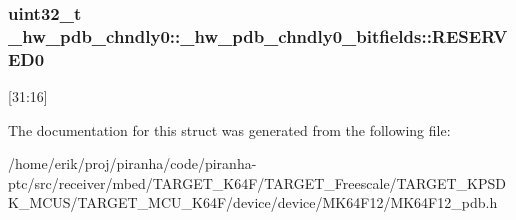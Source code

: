 \subsubsection[{\texorpdfstring{R\+E\+S\+E\+R\+V\+E\+D0}{RESERVED0}}]{\setlength{\rightskip}{0pt plus 5cm}uint32\+\_\+t \+\_\+hw\+\_\+pdb\+\_\+chndly0\+::\+\_\+hw\+\_\+pdb\+\_\+chndly0\+\_\+bitfields\+::\+R\+E\+S\+E\+R\+V\+E\+D0}\hypertarget{struct__hw__pdb__chndly0_1_1__hw__pdb__chndly0__bitfields_a1d112ef24724d14339072a9e6a89f8fb}{}\label{struct__hw__pdb__chndly0_1_1__hw__pdb__chndly0__bitfields_a1d112ef24724d14339072a9e6a89f8fb}
\mbox{[}31\+:16\mbox{]} 

The documentation for this struct was generated from the following file\+:\begin{DoxyCompactItemize}
\item 
/home/erik/proj/piranha/code/piranha-\/ptc/src/receiver/mbed/\+T\+A\+R\+G\+E\+T\+\_\+\+K64\+F/\+T\+A\+R\+G\+E\+T\+\_\+\+Freescale/\+T\+A\+R\+G\+E\+T\+\_\+\+K\+P\+S\+D\+K\+\_\+\+M\+C\+U\+S/\+T\+A\+R\+G\+E\+T\+\_\+\+M\+C\+U\+\_\+\+K64\+F/device/device/\+M\+K64\+F12/M\+K64\+F12\+\_\+pdb.\+h\end{DoxyCompactItemize}
